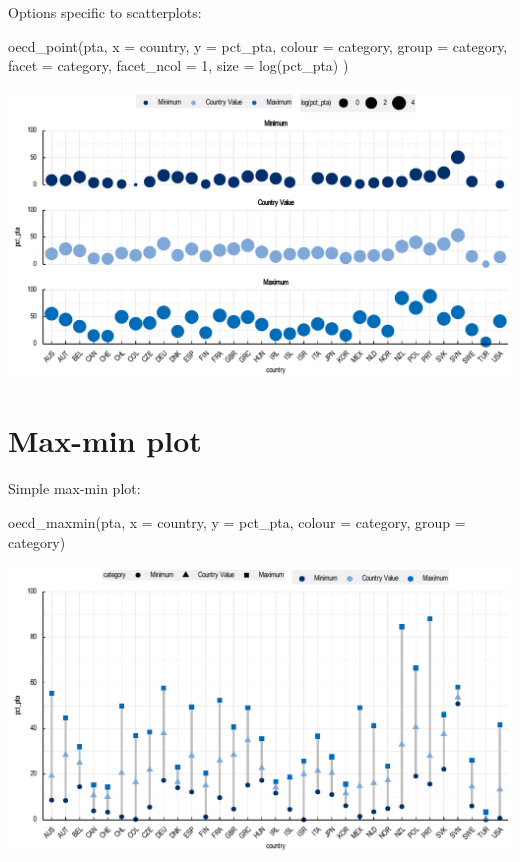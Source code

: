 \documentclass[
  11pt,
  oneside]{report}
\newenvironment{Shaded}{\begin{snugshade}}{\end{snugshade}}
\newcommand{\AttributeTok}[1]{\textcolor[rgb]{0.77,0.63,0.00}{#1}}
\newcommand{\DecValTok}[1]{\textcolor[rgb]{0.00,0.00,0.81}{#1}}
\newcommand{\FunctionTok}[1]{\textcolor[rgb]{0.00,0.00,0.00}{#1}}
\newcommand{\NormalTok}[1]{#1}
\begin{document}
Options specific to scatterplots:

\begin{Shaded}
\begin{Highlighting}[]
\FunctionTok{oecd\_point}\NormalTok{(pta,}
  \AttributeTok{x =}\NormalTok{ country, }\AttributeTok{y =}\NormalTok{ pct\_pta, }\AttributeTok{colour =}\NormalTok{ category, }\AttributeTok{group =}\NormalTok{ category,}
  \AttributeTok{facet =}\NormalTok{ category, }\AttributeTok{facet\_ncol =} \DecValTok{1}\NormalTok{, }\AttributeTok{size =} \FunctionTok{log}\NormalTok{(pct\_pta)}
\NormalTok{)}
\end{Highlighting}
\end{Shaded}

\begin{center}\includegraphics{book_figures/sp4-1} \end{center}

\hypertarget{max-min-plot}{%
\chapter{Max-min plot}\label{max-min-plot}}

Simple max-min plot:

\begin{Shaded}
\begin{Highlighting}[]
\FunctionTok{oecd\_maxmin}\NormalTok{(pta, }\AttributeTok{x =}\NormalTok{ country, }\AttributeTok{y =}\NormalTok{ pct\_pta, }\AttributeTok{colour =}\NormalTok{ category, }\AttributeTok{group =}\NormalTok{ category)}
\end{Highlighting}
\end{Shaded}

\begin{center}\includegraphics{book_figures/sm1-1} \end{center}
\end{document}
